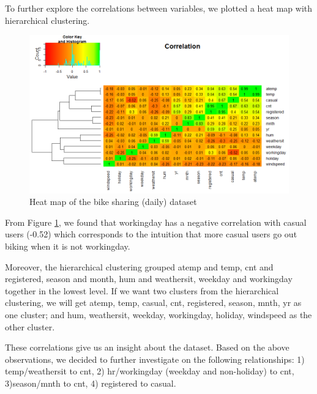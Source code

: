 \documentclass[12pt]{article}
\begin{document}
    To further explore the correlations between variables, we plotted a heat map with hierarchical clustering. 
	\begin{figure}[H]
		\includegraphics[scale=0.6]{figures/correlation.png}
		\caption{Heat map of the bike sharing (daily) dataset}
		\label{fig:correlation}
	\end{figure}
	From Figure \ref{fig:correlation}, we found that workingday has a negative correlation with casual users (-0.52) which corresponds to the intuition that more casual users go out biking when it is not workingday. 
	
	Moreover, the hierarchical clustering grouped atemp and temp, cnt and registered, season and month, hum and weathersit, weekday and workingday together in the lowest level.  If we want two clusters from the hierarchical clustering, we will get atemp, temp, casual, cnt, registered, season, mnth, yr as one cluster; and hum, weathersit, weekday, workingday, holiday, windspeed as the other cluster.
	
	These correlations give us an insight about the dataset. 	Based on the above observations, we decided to further investigate on the following relationships: 1) temp/weathersit to cnt, 2) hr/workingday (weekday and non-holiday) to cnt,  3)season/mnth to cnt, 4) registered to casual. 
	
	
\end{document}
